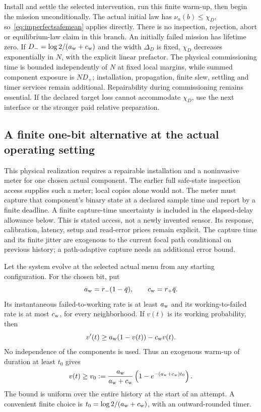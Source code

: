 Install and settle the selected intervention, run this finite warm-up,
then begin the mission unconditionally. The actual initial law has
$\nu_u(b)\le\chi_D$, so~\eqref{eq:imperfectsafemean} applies directly.
There is no inspection, rejection, abort or equilibrium-law claim in
this branch. An initially failed mission has lifetime zero. If
$D_-=\log2/(a_{\rm w}+c_{\rm w})$ and the width $\Delta_D$ is fixed,
$\chi_D$ decreases exponentially in $N$, with the explicit linear
prefactor. The physical commissioning time is bounded independently
of $N$ at fixed local margins, while summed component exposure is
$ND_+$; installation, propagation, finite slew, settling and timer
services remain additional. Repairability during commissioning remains
essential. If the declared target loss cannot accommodate $\chi_D$,
use the next interface or the stronger paid relative preparation.

\subsection{A finite one-bit alternative at the actual operating setting}
This physical realization requires a repairable installation and a
noninvasive meter for one chosen actual component. The earlier full
safe-state inspection access supplies such a meter; local copies alone
would not. The meter must capture that component's binary state at a
declared sample time and report by a finite deadline. A finite capture-time
uncertainty is included in the elapsed-delay allowance below. This is
stated access, not a newly invented sensor. Its response, calibration,
latency, setup and read-error prices remain explicit. The capture time and
its finite jitter are exogenous to the current focal path conditional on
previous history; a path-adaptive capture needs an additional error bound.

Let the system evolve at the selected actual menu from any starting
configuration. For the chosen bit, put
\[
 a_{\rm w}=r_-(1-\bar q),\qquad c_{\rm w}=r_+\bar q.
\]
Its instantaneous failed-to-working rate is at least $a_{\rm w}$ and
its working-to-failed rate is at most $c_{\rm w}$, for every neighborhood.
If $v(t)$ is its working probability, then
\[
 v'(t)\ge a_{\rm w}(1-v(t))-c_{\rm w}v(t).
\]
No independence of the components is used. Thus an exogenous warm-up
of duration at least $t_0$ gives
\begin{equation}
 v(t)\ge v_0:=\frac{a_{\rm w}}{a_{\rm w}+c_{\rm w}}
       \left(1-e^{-(a_{\rm w}+c_{\rm w})t_0}\right).
 \label{eq:witnesswarm}
\end{equation}
The bound is uniform over the entire history at the start of an attempt.
A convenient finite choice is
$t_0=\log2/(a_{\rm w}+c_{\rm w})$, with an outward-rounded timer.

